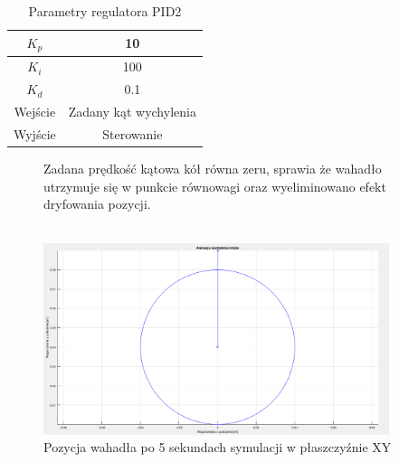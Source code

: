 \begin{table}[h!]
    \centering
    \begin{tabular}{|c|c|}
        \hline
        $K_p$ & 10 \\
        \hline
        $K_i$ & 100 \\
        \hline
        $K_d$ & 0.1 \\
        \hline
        Wejście & Zadany kąt wychylenia \\
        \hline
        Wyjście & Sterowanie \\
        \hline
    \end{tabular}
        
    \caption{Parametry regulatora PID2}
    \label{Parametry PID2}
\end{table}

\begin{figure}[h!]
    Zadana prędkość kątowa kół równa zeru, sprawia że wahadło utrzymuje się w punkcie równowagi oraz wyeliminowano efekt dryfowania pozycji.
    \\ \\
    \begin{center}
        \includegraphics[width=0.9\textwidth]{Rysunki/Rozdzial02/Podwojny_PID_animacja.png}
	    \caption{Pozycja wahadła po 5 sekundach symulacji w płaszczyźnie XY}
    \end{center}
\end{figure}

